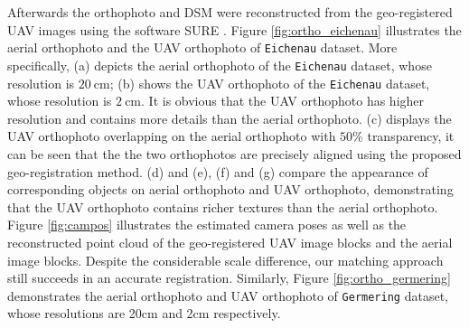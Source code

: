 Afterwards the orthophoto and DSM were reconstructed from the geo-registered UAV images using the software SURE \cite{rothermel2012sure}.
Figure \ref{fig:ortho_eichenau} illustrates the aerial orthophoto and the UAV orthophoto of \texttt{Eichenau} dataset.
More specifically, (a) depicts the aerial orthophoto of the \texttt{Eichenau} dataset, whose resolution is $\SI{20}{\cm}$; (b) shows the UAV orthophoto of the \texttt{Eichenau} dataset, whose resolution is $\SI{2}{\cm}$.
It is obvious that the UAV orthophoto has higher resolution and contains more details than the aerial orthophoto.
(c) displays the UAV orthophoto overlapping on the aerial orthophoto with $50$\% transparency, it can be seen that the the two orthophotos are precisely aligned using the proposed geo-registration method.
(d) and (e), (f) and (g) compare the appearance of corresponding objects on aerial orthophoto and UAV orthophoto, demonstrating that the UAV orthophoto contains richer textures than the aerial orthophoto. 
Figure \ref{fig:campos} illustrates the estimated camera poses as well as the reconstructed point cloud of the geo-registered UAV image blocks and the aerial image blocks. Despite the considerable scale difference, our matching approach still succeeds in an accurate registration. Similarly, Figure \ref{fig:ortho_germering} demonstrates the aerial orthophoto and UAV orthophoto of \texttt{Germering} dataset, whose resolutions are 20cm and 2cm respectively.
